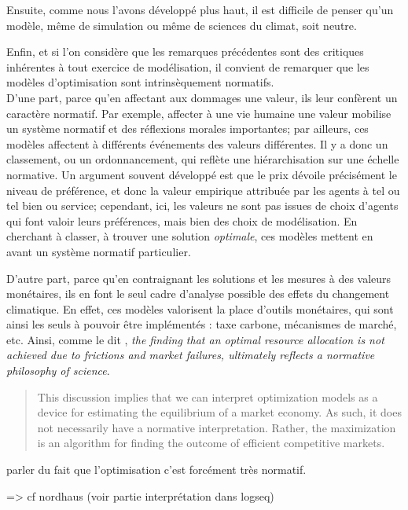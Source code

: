 Ensuite, comme nous l'avons développé plus haut, il est difficile de penser qu'un modèle, même de simulation ou même de sciences du climat, soit neutre. 

Enfin, et si l'on considère que les remarques précédentes sont des critiques inhérentes à tout exercice de modélisation, il convient de remarquer que les modèles d'optimisation sont intrinsèquement normatifs. \\

D'une part, parce qu'en affectant aux dommages une valeur, ils leur confèrent un caractère normatif. Par exemple, affecter à une vie humaine une valeur mobilise un système normatif et des réflexions morales importantes; par ailleurs, ces modèles affectent à différents événements des valeurs différentes. Il y a donc un classement, ou un ordonnancement, qui reflète une hiérarchisation sur une échelle normative. Un argument souvent développé est que le prix dévoile précisément le niveau de préférence, et donc la valeur empirique attribuée par les agents à tel ou tel bien ou service; cependant, ici, les valeurs ne sont pas issues de choix d'agents qui font valoir leurs préférences, mais bien des choix de modélisation. En cherchant à classer, à trouver une solution \emph{optimale}, ces modèles mettent en avant un système normatif particulier. 

D'autre part, parce qu'en contraignant les solutions et les mesures à des valeurs monétaires, ils en font le seul cadre d'analyse possible des effets du changement climatique. En effet, ces modèles valorisent la place d'outils monétaires, qui sont ainsi les seuls à pouvoir être implémentés : taxe carbone, mécanismes de marché, etc. Ainsi, comme le dit \cite{mercure_modelling_2019}, \emph{the finding that an optimal resource allocation is not achieved due to frictions and market failures, ultimately reflects a normative philosophy of science}. 

\begin{quote}
    This discussion implies that we can interpret optimization models as a device for estimating the equilibrium of a market economy. As such, it does not necessarily have a normative interpretation. Rather, the maximization is an algorithm for finding the outcome of efficient competitive markets.
\end{quote}

\begin{tcolorbox}
    parler du fait que l'optimisation c'est forcément très normatif. 

    => cf nordhaus (voir partie interprétation dans logseq)
\end{tcolorbox}



